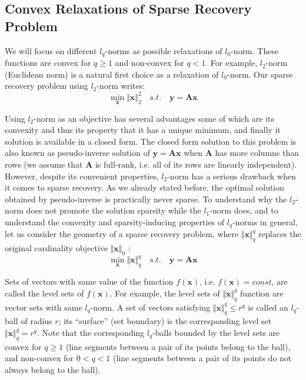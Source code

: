 \documentclass[journal]{IEEEtran}
\begin{document}
\subsection{Convex Relaxations of Sparse Recovery Problem}
We will focus on different $l_q$-norms as possible relaxations of $l_0$-norm. These functions are convex for $q\geq 1$ and non-convex for $q<1$. For example, $l_2$-norm (Euclidean norm) is a natural first choice as a relaxation of $l_0$-norm. Our sparse recovery problem using $l_2$-norm writes:
%
\begin{equation} \label{eq:l2_optimization}
	\min\limits_{\boldsymbol{x}}\Vert \boldsymbol{x}\Vert_2^2 \quad s.t. \quad \boldsymbol{y}=\boldsymbol{A} \boldsymbol{x}
\end{equation}

Using $l_2$-norm as an objective has several advantages some of which are its convexity and thus its property that it has a unique minimum, and finally it solution is available in a closed form. The closed form solution to this problem is also known as pseudo-inverse solution of $\boldsymbol{y}=\boldsymbol{A}\boldsymbol{x}$ when $\boldsymbol{A}$ has more columns than rows (we assume that $\boldsymbol{A}$ is full-rank, i.e. all of its rows are linearly independent). However, despite its convenient properties, $l_2$-norm has a serious drawback when it comes to sparse recovery. As we already stated before, the optimal solution obtained by pseudo-inverse is practically never sparse. To understand why the $l_2$-norm does not promote the solution sparsity while the $l_1$-norm does, and to understand the convexity and sparsity-inducing properties of $l_q$-norms in general, let us consider the geometry of a sparse recovery problem, where $\Vert \boldsymbol{x}\Vert_q^q$ replaces the original cardinality objective $\Vert \boldsymbol{x}\Vert_0$ :
%
\begin{equation} \label{eq:lq_optimization}
\min\limits_{\boldsymbol{x}}\Vert \boldsymbol{x}\Vert_q^q \quad s.t. \quad \boldsymbol{y}=\boldsymbol{A} \boldsymbol{x}
\end{equation}

Sets of vectors with same value of the function $f(\boldsymbol{x})$, i.e. $f(\boldsymbol{x})=const$, are called the level sets of $f(\boldsymbol{x})$. For example, the level sets of $\Vert \boldsymbol{x}\Vert_q^q$ function are vector sets with same $l_q$-norm. A set of vectors satisfying $\Vert \boldsymbol{x}\Vert_q^q \leq r^q$ is called an $l_q$-ball of radius $r$; its “surface” (set boundary) is the corresponding level set $\Vert \boldsymbol{x}\Vert_q^q = r^q$. Note that the corresponding $l_q$-balls bounded by the level sets are convex for $q\geq 1$ (line segments between a pair of its points belong to the ball), and non-convex for $0<q<1$ (line segments between a pair of its points do not always belong to the ball).
\end{document}
